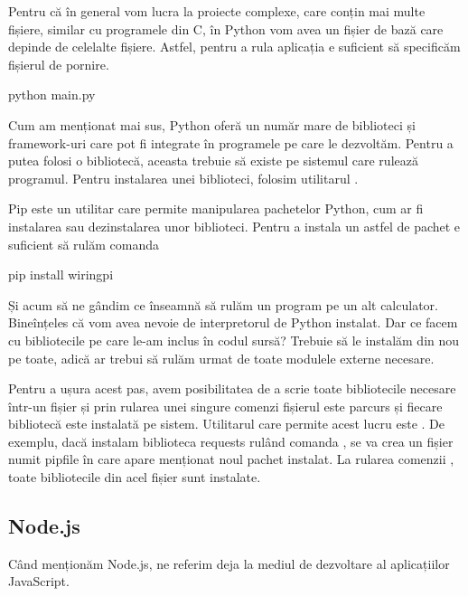 Pentru că în general vom lucra la proiecte complexe, care conțin mai multe
fișiere, similar cu programele din C, în Python vom avea un fișier de bază care
depinde de celelalte fișiere. Astfel, pentru a rula aplicația e suficient să
specificăm fișierul de pornire.

\begin{screen}
python main.py
\end{screen}

Cum am menționat mai sus, Python oferă un număr mare de biblioteci și
framework-uri care pot fi integrate în programele pe care le dezvoltăm. Pentru a
putea folosi o bibliotecă, aceasta trebuie să existe pe sistemul care rulează
programul. Pentru instalarea unei biblioteci, folosim utilitarul .

Pip este un utilitar care permite manipularea pachetelor Python, cum ar fi
instalarea sau dezinstalarea unor biblioteci. Pentru a instala un astfel de
pachet e suficient să rulăm comanda 

\begin{screen}
pip install wiringpi
\end{screen}

Și acum să ne gândim ce înseamnă să rulăm un program pe un alt calculator.
Bineînțeles că vom avea nevoie de interpretorul de Python instalat. Dar ce facem
cu bibliotecile pe care le-am inclus în codul sursă? Trebuie să le instalăm din
nou pe toate, adică ar trebui să rulăm  urmat de toate modulele
externe necesare.

Pentru a ușura acest pas, avem posibilitatea de a scrie toate bibliotecile
necesare într-un fișier și prin rularea unei singure comenzi fișierul este
parcurs și fiecare bibliotecă este instalată pe sistem. Utilitarul care permite
acest lucru este . De exemplu, dacă instalam biblioteca requests
rulând comanda , se va crea un fișier numit pipfile
în care apare menționat noul pachet instalat. La rularea comenzii , toate bibliotecile din acel fișier sunt instalate.

\subsection{Node.js}
\label{sec:appdev-ideinstall-js}

Când menționăm Node.js, ne referim deja la mediul de dezvoltare al aplicațiilor
JavaScript.

